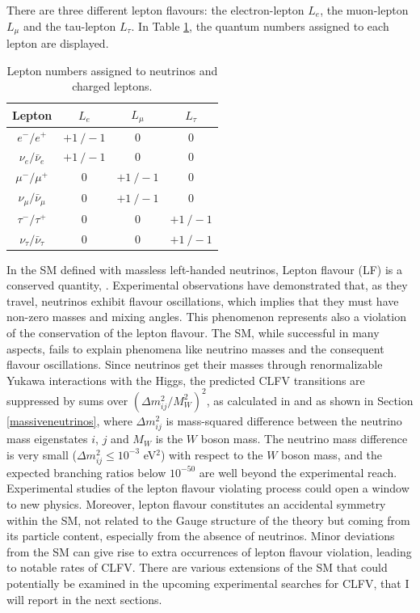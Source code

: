 There are three different lepton flavours: the electron-lepton $L_e$, 
the muon-lepton $L_{\mu}$ and the tau-lepton $L_{\tau}$. In Table 
\ref{tab:leptons}, the quantum numbers assigned to each lepton are displayed.
 \begin{center}  
\begin{table}[!h]
\centering
\renewcommand{\arraystretch}{1.5}
\begin{tabular}{c c c c}
\hline
Lepton & $L_e$ & $L_{\mu}$ & $L_{\tau}$\\
\hline
$e^-/e^+$ & $+1 \ /-1$ & 0 & 0 \\
$\nu_{e}/\bar{\nu}_{e}$ & $+1 \ /-1$ & 0 & 0 \\
$\mu^-/\mu^+$ & 0 & $+1 \ /-1$ & 0 \\
$\nu_{\mu}/\bar{\nu}_{\mu}$ & 0 & $+1 \ /-1$ & 0 \\
$\tau^-/\tau^+$ & 0 & 0 & $+1 \ /-1$\\
$\nu_{\tau}/\bar{\nu}_{\tau}$ & 0 & 0 & $+1 \ /-1$ \\
\hline
\end{tabular}
\caption{Lepton numbers assigned to neutrinos and charged leptons.}
\label{tab:leptons}
\end{table}
\end{center}
In the SM defined with massless 
left-handed neutrinos, Lepton flavour (LF) is a conserved quantity, 
\cite{universe8060299}. Experimental observations have 
demonstrated that, as they travel, neutrinos exhibit flavour 
oscillations, which implies that they must have non-zero masses 
and mixing angles. This phenomenon represents also a violation 
of the conservation of the lepton flavour. The SM, 
while successful in many aspects, fails to explain phenomena 
like neutrino masses and the consequent flavour oscillations. 
Since neutrinos get their masses through renormalizable Yukawa interactions
with the Higgs, the predicted CLFV transitions are suppressed 
by sums over $(\Delta m^2_{i j}/M^2 _W)^2$, as calculated in 
\cite{MARCIANO1977303} and as shown in Section 
\ref{massiveneutrinos}, where $\Delta m^2_{ij}$ is mass-squared 
difference between the neutrino mass eigenstates $i$, $j$ and 
$M_W$ is the $W$ boson mass. The neutrino mass difference is 
very small ($\Delta m^2 _{i j} \leq 10^{-3}$ eV$^2$) with respect to the $W$ boson mass,
and the expected branching ratios  
below $10^{-50}$ are well beyond the experimental reach. Experimental studies 
of the lepton flavour violating process could open a window to new physics. 
Moreover, lepton flavour constitutes an accidental symmetry within the SM, 
not related to the Gauge structure of the theory but coming
from its particle content, especially from the absence of   neutrinos.
%
Minor deviations from the SM can  give rise to extra 
occurrences of lepton flavour violation, leading to notable rates of CLFV.
There are various extensions of the SM that could potentially 
be examined in the upcoming experimental searches for CLFV, that 
I will report in the next sections.


